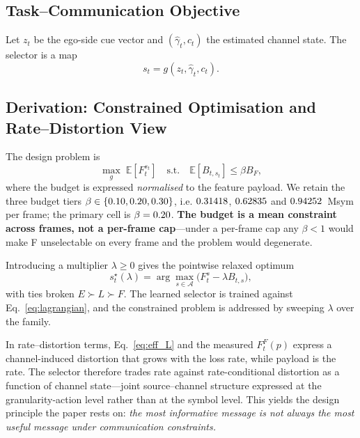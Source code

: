\documentclass[journal]{IEEEtran}
\begin{document}
\subsection{Task--Communication Objective}
Let $z_t$ be the ego-side cue vector and $(\hat\gamma_t, c_t)$ the estimated channel state. The
selector is a map
\begin{equation}
s_t = g(z_t, \hat\gamma_t, c_t).
\label{eq:selector}
\end{equation}

\subsection{Derivation: Constrained Optimisation and Rate--Distortion View}\label{sec:derivation}
The design problem is
\begin{equation}
\max_{g}\; \mathbb{E}\!\left[F_t^{s_t}\right]
\quad \text{s.t.} \quad \mathbb{E}\!\left[B_{t,s_t}\right] \le \beta B_F ,
\label{eq:constrained}
\end{equation}
where the budget is expressed \emph{normalised} to the feature payload. We retain the three budget
tiers $\beta \in \{0.10, 0.20, 0.30\}$, i.e.
$0.31418$, $0.62835$ and $0.94252$~Msym per frame; the primary cell is
$\beta = 0.20$. \textbf{The budget is a mean constraint across frames, not a per-frame
cap}---under a per-frame cap any $\beta < 1$ would make F unselectable on every frame and the problem
would degenerate.

Introducing a multiplier $\lambda \ge 0$ gives the pointwise relaxed optimum
\begin{equation}
s_t^{\star}(\lambda) = \arg\max_{s \in \mathcal{A}} \bigl(F_t^{s} - \lambda B_{t,s}\bigr),
\label{eq:lagrangian}
\end{equation}
with ties broken $E \succ L \succ F$. The learned selector is trained against
Eq.~\eqref{eq:lagrangian}, and the constrained problem is addressed by sweeping $\lambda$ over the
family.

In rate--distortion terms, Eq.~\eqref{eq:eff_L} and the measured $F_t^{F}(p)$ express a
channel-induced distortion that grows with the loss rate, while payload is the rate. The selector
therefore trades rate against rate-conditional distortion as a function of channel state---joint
source--channel structure expressed at the granularity-action level rather than at the symbol level.
This yields the design principle the paper rests on: \emph{the most informative message is not always
the most useful message under communication constraints.}
\end{document}
